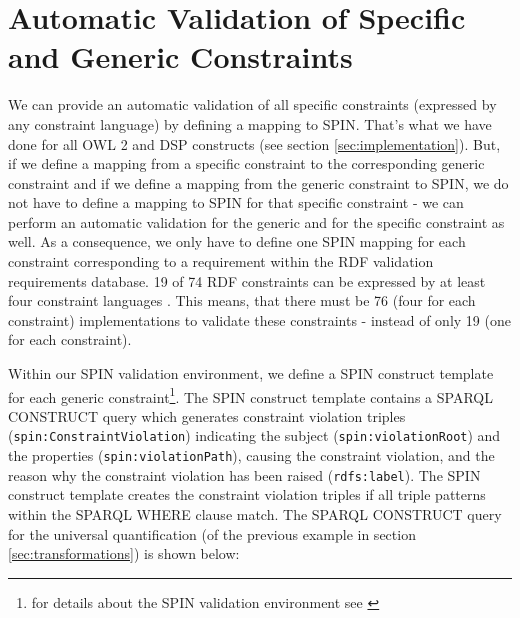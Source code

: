 \documentclass{llncs}
\newcommand{\ms}[1]{\texttt{#1}}
\begin{document}

\section{Automatic Validation of Specific and Generic Constraints}
\label{sec:validation}

We can provide an automatic validation of all specific constraints (expressed by any constraint language) by defining a mapping to SPIN.
That's what we have done for all OWL 2 and DSP constructs (see section \ref{sec:implementation}).
But, if we define a mapping from a specific constraint to the corresponding generic constraint and if we define a mapping from the generic constraint to SPIN,
we do not have to define a mapping to SPIN for that specific constraint - we can perform an automatic validation for the generic and for the specific constraint as well.
As a consequence, we only have to define one SPIN mapping for each constraint corresponding to a requirement within the RDF validation requirements database.
19 of 74 RDF constraints can be expressed by at least four constraint languages \cite{BoschNolleAcarEckert2015}.
This means, that there must be 76 (four for each constraint) implementations to validate  these constraints - instead of only 19 (one for each constraint).

Within our SPIN validation environment, we define a SPIN construct template for each generic constraint\footnote{for details about the SPIN validation environment see \cite{BoschEckert2014-2}}.
The SPIN construct template contains a SPARQL CONSTRUCT query which generates constraint violation triples (\ms{spin:ConstraintViolation}) indicating the subject (\ms{spin:violationRoot}) and the properties (\ms{spin:violationPath}), causing the constraint violation, and the reason why the constraint violation has been raised (\ms{rdfs:label}).
The SPIN construct template creates the constraint violation triples if all triple patterns within the SPARQL WHERE clause match.
The SPARQL CONSTRUCT query for the universal quantification (of the previous example in section \ref{sec:transformations}) is shown below:
\end{document}
